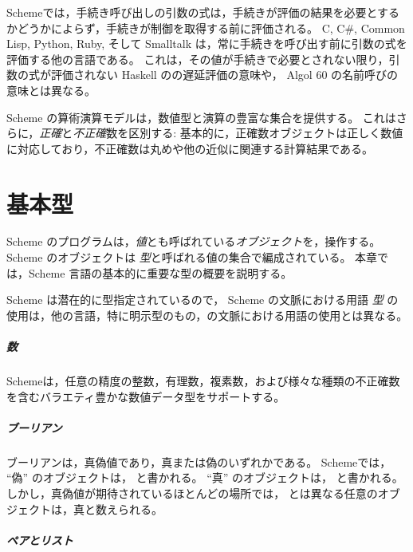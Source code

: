Schemeでは，手続き呼び出しの引数の式は，手続きが評価の結果を​​必要とするかどうかによらず，手続きが制御を取得する前に評価される。
C, C\#, Common Lisp, Python, Ruby, そして Smalltalk は，常に手続きを呼び出す前に引数の式を評価する他の言語である。
これは，その値が手続きで必要とされない限り，引数の式が評価されない Haskell のの遅延評価の意味や， Algol 60 の名前呼びの意味とは異なる。

Scheme の算術演算モデルは，数値型と演算の豊富な集合を提供する。
これはさらに，\textit{正確}と\textit{不正確}数を区別する: 
基本的に，正確数オブジェクトは正しく数値に対応しており，不正確数は丸めや他の近似に関連する計算結果である。

\chapter{基本型}

Scheme のプログラムは，\textit{値}とも呼ばれている\textit{オブジェクト}を，操作する。
Scheme のオブジェクトは \textit{型}と呼ばれる値の集合で編成されている。
本章では，Scheme 言語の基本的に重要な型の概要を説明する。

\begin{note}
  Scheme は潜在的に型指定されているので， Scheme の文脈における用語 \textit{型} の使用は，他の言語，特に明示型のもの，の文脈における用語の使用とは異なる。
\end{note}

\paragraph{数}

Schemeは，任意の精度の整数，有理数，複素数，および様々な種類の不正確数を含むバラエティ豊かな数値データ型をサポートする。

\paragraph{ブーリアン}

ブーリアンは，真偽値であり，真または偽のいずれかである。
Schemeでは， ``偽'' のオブジェクトは， \schfalse{} と書かれる。
``真'' のオブジェクトは， \schtrue{} と書かれる。
しかし，真偽値が期待されているほとんどの場所では，\schfalse{} とは異なる任意のオブジェクトは，真と数えられる。

\paragraph{ペアとリスト}

